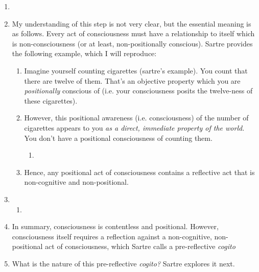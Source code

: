 \begin{enumerate}
  \item {}
  \item My understanding of this step is not very clear, but the essential meaning is as follows. Every act of consciousness must have a relationship to itself which is non-consciousness (or at least, non-positionally conscious). Sartre provides the following example, which I will reproduce:
  \begin{enumerate}
    \item Imagine yourself counting cigarettes (sartre's example). You count that there are twelve of them. That's an objective property which you are \emph{positionally} conscious of (i.e. your consciousness posits the twelve-ness of these cigarettes).
    \item However, this positional awareness (i.e. consciousness) of the number of cigarettes appears to you \emph{as a direct, immediate property of the world.} You don't have a positional consciousness of counting them.
    \begin{enumerate}
      \item {}
    \end{enumerate}
    \item Hence, any positional act of consciousness contains a reflective act that is non-cognitive and non-positional.
  \end{enumerate}
  \item {}
  \begin{enumerate}
    \item {}
  \end{enumerate}
  \item In summary, consciousness is contentless and positional. However, consciousness itself requires a reflection against a non-cognitive, non-positional act of consciousness, which Sartre calls a pre-reflective \emph{cogito}
  \item What is the nature of this pre-reflective \emph{cogito?} Sartre explores it next.
\end{enumerate}


